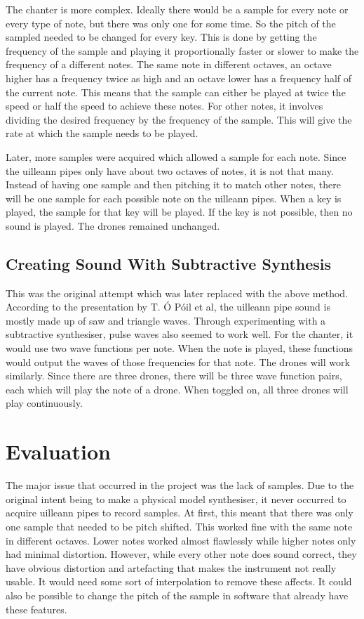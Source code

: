 \documentclass[12pt]{article}
\begin{document}
	The chanter is more complex. Ideally there would be a sample for every note or every type of note, but there was only one
	for some time. So the pitch of the sampled needed to be changed for every key. This is done by getting the frequency of 
	the sample and playing it proportionally faster or slower to make the frequency of a different notes. The same note in 
	different octaves, an octave higher has a frequency twice as high and an octave lower has a frequency half of the current note.
	This means that the sample can either be played at twice the speed or half the speed to achieve these notes. For other notes,
	it involves dividing the desired frequency by the frequency of the sample. This will give the rate at which the sample 
	needs to be played.
	
	Later, more samples were acquired which allowed a sample for each note. Since the uilleann pipes only have about two
	octaves of notes, it is not that many. Instead of having one sample and then pitching it to match other notes, there will be one 
	sample for each possible note on the uilleann pipes. When a key is played, the sample for that key will be played. If the key
	is not possible, then no sound is played. The drones remained unchanged. 
	
	
	\subsection{Creating Sound With Subtractive Synthesis}
	This was the original attempt which was later replaced with the above method.
	According to the presentation by T. Ó Póil \cite{uilleannSubtractive} et al, the uilleann pipe sound is mostly made up of saw and triangle waves. Through
	experimenting with a subtractive synthesiser, pulse waves also seemed to work well. For the chanter, it would use two wave 
	functions per note. When the note is played, these functions would output the waves of those frequencies for that note.
	The drones will work similarly. Since there are three drones, there will be three wave function pairs, each which will play
	the note of a drone. When toggled on, all three drones will play continuously.
	
		
		
\section {Evaluation}
	
	The major issue that occurred in the project was the lack of samples. Due to the original intent being to make
	a physical model synthesiser, it never occurred to acquire uilleann pipes to record samples. At first, this meant that 
	there was only one sample that needed to be pitch shifted. This worked fine with the same note in different octaves. Lower
	notes worked almost flawlessly while higher notes only had minimal distortion. However, while every other note does sound correct,
	they have obvious distortion and artefacting that makes the instrument not really usable. It would need some sort of interpolation
	to remove these affects. It could also be possible to change the pitch of the sample in software that already have these features.
	
\end{document}
